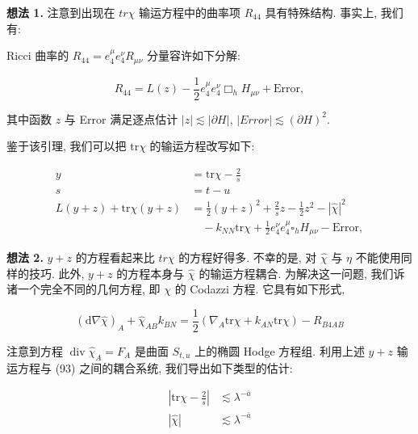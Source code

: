 \textbf{想法 1.} 注意到出现在 $tr\chi$ 输运方程中的曲率项 $R_{44}$ 具有特殊结构. 事实上, 我们有:

\begin{lemma}[重要分解]\label{lem:cG-3.19}
Ricci 曲率的 $R_{44} = e_{4}^{\mu} e_{4}^{\nu} R_{\mu\nu}$ 分量容许如下分解:

\begin{equation}
R _ {4 4} = L (z) - \frac {1}{2} e _ {4} ^ {\mu} e _ {4} ^ {\nu} \Box _ {h} H _ {\mu \nu} + \mathrm{Error}, \label{eq:cG-92}
\end{equation}

其中函数 $z$ 与 Error 满足逐点估计 $|z| \lesssim |\partial H|$, $|Error| \lesssim (\partial H)^2$. 
\end{lemma}

鉴于该引理, 我们可以把 $\mathrm{tr}\chi$ 的输运方程改写如下:

\begin{align*}
y &= \mathrm{tr} \chi - \frac {2}{s} \\
s &= t - u \\
L (y + z) + \mathrm{tr} \chi (y + z) &= \frac {1}{2} (y + z) ^ {2} + \frac {2}{s} z - \frac {1}{2} z ^ {2} - | \hat {\chi} | ^ {2} \\
&\quad - k _ {N N} \mathrm{tr} \chi + \frac {1}{2} e _ {4} ^ {\nu} e _ {4} ^ {\mu} \square_ {h} H _ {\mu \nu} - \mathrm{Error}, 
\end{align*}

\textbf{想法 2.} $y + z$ 的方程看起来比 $tr\chi$ 的方程好得多. 不幸的是, 对 $\hat{\chi}$ 与 $\eta$ 不能使用同样的技巧. 此外, $y + z$ 的方程本身与 $\hat{\chi}$ 的输运方程耦合. 为解决这一问题, 我们诉诸一个完全不同的几何方程, 即 $\chi$ 的 Codazzi 方程. 它具有如下形式, 

\begin{equation}
(\mathrm{d} \nabla \hat {\chi}) _ {A} + \hat {\chi} _ {A B} k _ {B N} = \frac {1}{2} (\nabla_ {A} \mathrm{tr} \chi + k _ {A N} \mathrm{tr} \chi) - R _ {B 4 A B}\label{eq:cG-93}
\end{equation}

注意到方程 $\operatorname{div}\hat{\chi}_{A}=F_{A}$ 是曲面 $S_{t, u}$ 上的椭圆 Hodge 方程组. 利用上述 $y+z$ 输运方程与 (93) 之间的耦合系统, 我们导出如下类型的估计:

\[
\begin{aligned}
| \mathrm{tr} \chi - \frac {2}{s} | &\lesssim \lambda^ {- \bar {a}} \\
| \hat {\chi} | &\lesssim \lambda^ {- \bar {a}}
\end{aligned}
\]

